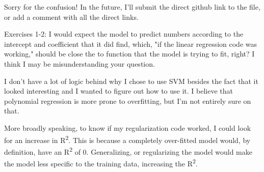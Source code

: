 \documentclass[letterpaper]{article}
\begin{document}
Sorry for the confusion! In the future, I'll submit the direct github
link to the file, or add a comment with all the direct links.

Exercises 1-2: I would expect the model to predict numbers according to
the intercept and coefficient that it did find, which, "if the linear
regression code was working," should be close the to function that the
model is trying to fit, right? I think I may be misunderstanding your
question.

I don't have a lot of logic behind why I chose to use SVM besides the
fact that it looked interesting and I wanted to figure out how to use
it. I believe that polynomial regression is more prone to overfitting,
but I'm not entirely sure on that.

More broadly speaking, to know if my regularization code worked, I could
look for an increase in R\textsuperscript{2}. This is because a completely over-fitted
model would, by definition, have an R\textsuperscript{2} of 0. Generalizing, or
regularizing the model would make the model less specific to the
training data, increasing the R\textsuperscript{2}.
\end{document}
